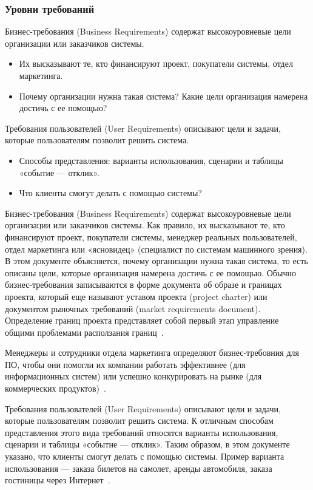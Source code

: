 \documentclass{../industrial-development}
\begin{document}
\begin{frame} \frametitle{Уровни требований}
  \begin{block}{}
\alert{Бизнес-требования (Business Requirements)} содержат высокоуровневые цели организации или заказчиков системы.
  \end{block}
   \begin{itemize}
\item Их высказывают те, кто финансируют проект, покупатели системы, отдел маркетинга.
\item Почему организации нужна такая система? Какие цели организация намерена достичь с ее помощью?
\end{itemize}
  \begin{block}{}
\alert{Требования пользователей (User Requirements)} описывают цели и задачи, которые пользователям позволит решить система. 
    \end{block}
 \begin{itemize}
	\item Способы представления: варианты использования, сценарии и таблицы «событие — отклик». 
	\item Что клиенты смогут делать с помощью системы?
  \end{itemize}
\end{frame}

\lecturenotes

\alert{Бизнес-требования (Business Requirements)} содержат высокоуровневые цели организации или заказчиков системы. Как правило, их высказывают те, кто финансируют проект, покупатели системы, менеджер реальных пользователей, отдел маркетинга или «ясновидец» (специалист по системам машинного зрения). В этом документе объясняется, почему организации нужна такая система, то есть описаны цели, которые организация намерена достичь с ее помощью. Обычно бизнес-требования записываются в форме документа об образе и границах проекта, который еще называют уставом проекта (project charter) или документом рыночных требований (market requirements document).
Определение границ проекта представляет собой первый этап управление общими проблемами расползания границ~\cite[с.~7]{Wiegers}.

Менеджеры и сотрудники отдела маркетинга определяют бизнес-требовния для ПО, чтобы они помогли их компании работать эффективнее (для информационных систем) или успешно конкурировать на рынке (для коммерческих продуктов)~\cite[с.~11]{Wiegers}.

\alert{Требования пользователей (User Requirements)} описывают цели и задачи, которые пользователям позволит решить система. К отличным способам представления этого вида требований относятся варианты использования, сценарии и таблицы «событие — отклик». Таким образом, в этом документе указано, что клиенты смогут делать с помощью системы. Пример варианта использования — заказа билетов на самолет, аренды автомобиля, заказа гостиницы через Интернет~\cite[с.~8--9]{Wiegers}.
\end{document}
